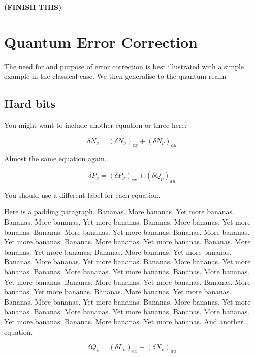 \documentclass[12pt,a4paper]{report}
\begin{document}
\textbf{(FINISH THIS)}

\section{Quantum Error Correction}
The need for and purpose of error correction is best illustrated with a simple example in the classical case. We then generalise to the quantum realm

\subsection{Hard bits}
You might want to include another equation or three here:

\begin{equation}
  \delta N_{\nu} = (\delta N_{\nu})_{ex} + (\delta N_{\nu})_{au} 
  \label{equation:delsplit2}
\end{equation}

Almost the same equation again.

\begin{equation}
  \delta P_{\nu} = (\delta P_{\nu})_{ex} + (\delta Q_{\nu})_{au} 
  \label{equation:delsplit3}
\end{equation}

You should use a different label for each equation.

Here is a padding paragraph.  Bananas.  More bananas.  Yet more
bananas.  Bananas.  More bananas.  Yet more bananas.  Bananas.  More
bananas.  Yet more bananas.  Bananas.  More bananas.  Yet more
bananas.  Bananas.  More bananas.  Yet more bananas.  Bananas.  More
bananas.  Yet more bananas.  Bananas.  More bananas.  Yet more
bananas.  Bananas.  More bananas.  Yet more bananas.  Bananas.  More
bananas.  Yet more bananas.  Bananas.  More bananas.  Yet more
bananas.  Bananas.  More bananas.  Yet more bananas.  Bananas.  More
bananas.  Yet more bananas.  Bananas.  More bananas.  Yet more
bananas.  Bananas.  More bananas.  Yet more bananas.  Bananas.  More
bananas.  Yet more bananas.  Bananas.  More bananas.  Yet more
bananas.  Bananas.  More bananas.  Yet more bananas.  Bananas.  More
bananas.  Yet more bananas.  Bananas.  More bananas.  Yet more
bananas.  Bananas.  More bananas.  Yet more bananas. And another
equation.

\begin{equation}
  \delta Q_{\nu} = (\delta L_{\nu})_{ex} + (\delta X_{\nu})_{au} 
  \label{equation:delsplit4}
\end{equation}
\end{document}
